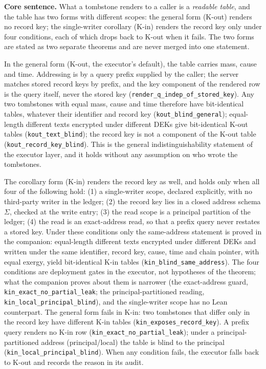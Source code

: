 \documentclass[11pt,a4paper]{article}
\newcommand{\thm}[1]{\nolinkurl{#1}}
\begin{document}
\textbf{Core sentence.} What a tombstone renders to a caller is a \emph{readable table}, and the table has two forms with different scopes: the general form (K-out) renders no record key; the single-writer corollary (K-in) renders the record key only under four conditions, each of which drops back to K-out when it fails. The two forms are stated as two separate theorems and are never merged into one statement.

In the general form (K-out, the executor's default), the table carries mass, cause and time. Addressing is by a query prefix supplied by the caller; the server matches stored record keys by prefix, and the key component of the rendered row is the query itself, never the stored key (\thm{render_q_indep_of_stored_key}). Any two tombstones with equal mass, cause and time therefore have bit-identical tables, whatever their identifier and record key (\thm{kout_blind_general}); equal-length different texts encrypted under different DEKs give bit-identical K-out tables (\thm{kout_text_blind}); the record key is not a component of the K-out table (\thm{kout_record_key_blind}). This is the general indistinguishability statement of the executor layer, and it holds without any assumption on who wrote the tombstones.

The corollary form (K-in) renders the record key as well, and holds only when all four of the following hold: (1) a single-writer scope, declared explicitly, with no third-party writer in the ledger; (2) the record key lies in a closed address schema $\Sigma$, checked at the write entry; (3) the read scope is a principal partition of the ledger; (4) the read is an exact-address read, so that a prefix query never restates a stored key. Under these conditions only the same-address statement is proved in the companion: equal-length different texts encrypted under different DEKs and written under the same identifier, record key, cause, time and chain pointer, with equal exergy, yield bit-identical K-in tables (\thm{kin_blind_same_address}). The four conditions are deployment gates in the executor, not hypotheses of the theorem; what the companion proves about them is narrower (the exact-address guard, \thm{kin_exact_no_partial_leak}; the principal-partitioned reading, \thm{kin_local_principal_blind}), and the single-writer scope has no Lean counterpart. The general form fails in K-in: two tombstones that differ only in the record key have different K-in tables (\thm{kin_exposes_record_key}). A prefix query renders no K-in row (\thm{kin_exact_no_partial_leak}); under a principal-partitioned address (principal/local) the table is blind to the principal (\thm{kin_local_principal_blind}). When any condition fails, the executor falls back to K-out and records the reason in its audit.
\end{document}
